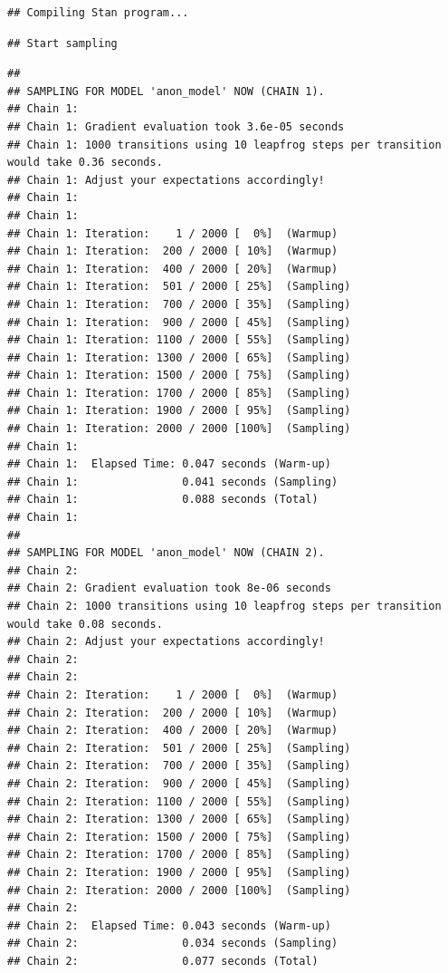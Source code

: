 \documentclass[
]{book}
\begin{document}
\begin{verbatim}
## Compiling Stan program...
\end{verbatim}

\begin{verbatim}
## Start sampling
\end{verbatim}

\begin{verbatim}
## 
## SAMPLING FOR MODEL 'anon_model' NOW (CHAIN 1).
## Chain 1: 
## Chain 1: Gradient evaluation took 3.6e-05 seconds
## Chain 1: 1000 transitions using 10 leapfrog steps per transition would take 0.36 seconds.
## Chain 1: Adjust your expectations accordingly!
## Chain 1: 
## Chain 1: 
## Chain 1: Iteration:    1 / 2000 [  0%]  (Warmup)
## Chain 1: Iteration:  200 / 2000 [ 10%]  (Warmup)
## Chain 1: Iteration:  400 / 2000 [ 20%]  (Warmup)
## Chain 1: Iteration:  501 / 2000 [ 25%]  (Sampling)
## Chain 1: Iteration:  700 / 2000 [ 35%]  (Sampling)
## Chain 1: Iteration:  900 / 2000 [ 45%]  (Sampling)
## Chain 1: Iteration: 1100 / 2000 [ 55%]  (Sampling)
## Chain 1: Iteration: 1300 / 2000 [ 65%]  (Sampling)
## Chain 1: Iteration: 1500 / 2000 [ 75%]  (Sampling)
## Chain 1: Iteration: 1700 / 2000 [ 85%]  (Sampling)
## Chain 1: Iteration: 1900 / 2000 [ 95%]  (Sampling)
## Chain 1: Iteration: 2000 / 2000 [100%]  (Sampling)
## Chain 1: 
## Chain 1:  Elapsed Time: 0.047 seconds (Warm-up)
## Chain 1:                0.041 seconds (Sampling)
## Chain 1:                0.088 seconds (Total)
## Chain 1: 
## 
## SAMPLING FOR MODEL 'anon_model' NOW (CHAIN 2).
## Chain 2: 
## Chain 2: Gradient evaluation took 8e-06 seconds
## Chain 2: 1000 transitions using 10 leapfrog steps per transition would take 0.08 seconds.
## Chain 2: Adjust your expectations accordingly!
## Chain 2: 
## Chain 2: 
## Chain 2: Iteration:    1 / 2000 [  0%]  (Warmup)
## Chain 2: Iteration:  200 / 2000 [ 10%]  (Warmup)
## Chain 2: Iteration:  400 / 2000 [ 20%]  (Warmup)
## Chain 2: Iteration:  501 / 2000 [ 25%]  (Sampling)
## Chain 2: Iteration:  700 / 2000 [ 35%]  (Sampling)
## Chain 2: Iteration:  900 / 2000 [ 45%]  (Sampling)
## Chain 2: Iteration: 1100 / 2000 [ 55%]  (Sampling)
## Chain 2: Iteration: 1300 / 2000 [ 65%]  (Sampling)
## Chain 2: Iteration: 1500 / 2000 [ 75%]  (Sampling)
## Chain 2: Iteration: 1700 / 2000 [ 85%]  (Sampling)
## Chain 2: Iteration: 1900 / 2000 [ 95%]  (Sampling)
## Chain 2: Iteration: 2000 / 2000 [100%]  (Sampling)
## Chain 2: 
## Chain 2:  Elapsed Time: 0.043 seconds (Warm-up)
## Chain 2:                0.034 seconds (Sampling)
## Chain 2:                0.077 seconds (Total)

\end{verbatim}
\end{document}
